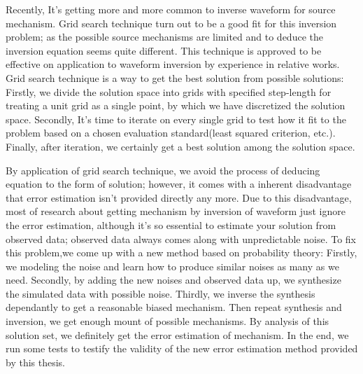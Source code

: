 \begin{enabstract}
Recently, It's getting more and more common to inverse waveform for source mechanism. Grid search technique turn out to be a good fit for this inversion problem; as the possible source mechanisms are limited and to deduce the inversion equation seems quite different. This technique is approved to be effective on application to waveform inversion by experience in relative works. Grid search technique is a way to get the best solution from possible solutions: Firstly, we divide the solution space into grids with specified step-length for treating a unit grid as a single point, by which we have discretized the solution space. Secondly, It's time to iterate on every single grid to test how it fit to the problem based on a chosen evaluation standard(least squared criterion, etc.). Finally, after iteration, we certainly get a best solution among the solution space.

By application of grid search technique, we avoid the process of deducing equation to the form of solution; however, it comes with a inherent disadvantage that error estimation isn't provided directly any more. Due to this disadvantage, most of research about getting mechanism by inversion of waveform just ignore the error estimation, although it's so essential to estimate your solution from observed data; observed data always comes along with unpredictable noise. To fix this problem,we come up with a new method based on probability theory: Firstly, we modeling the noise and learn how to produce similar noises as many as we need. Secondly, by adding the new noises and observed data up, we synthesize the simulated data with possible noise. Thirdly, we inverse the synthesis dependantly to get a reasonable biased mechanism. Then repeat synthesis and inversion, we get enough mount of possible mechanisms. By analysis of this solution set, we definitely get the error estimation of mechanism. In the end, we run some tests to testify the validity of the new error estimation method provided by this thesis.


\end{enabstract}
